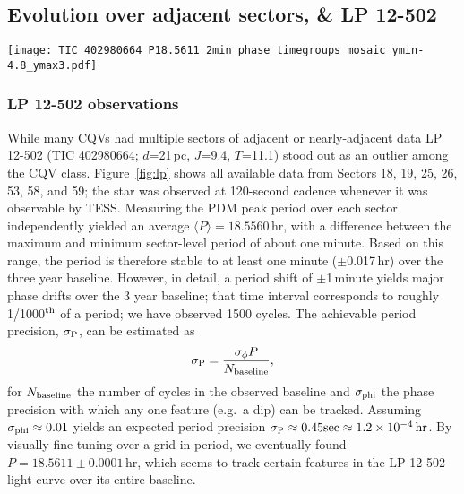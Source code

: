 \documentclass[11pt,twocolumn,tighten]{aastex63}
\begin{document}
\subsection{Evolution over adjacent sectors, \& LP 12-502}
\begin{figure*}[!t]
	\begin{center}
		\centering
		\texttt{[image: TIC\_402980664\_P18.5611\_2min\_phase\_timegroups\_mosaic\_ymin-4.8\_ymax3.pdf]}
		\vspace{-0.45cm}
		\caption{
			Evolution of LP 12-502 ($P$=18.6\,h) at fixed period and
			epoch over three years. 
			Each panel shows one (stacked) TESS orbit; small text denotes relative cycle number.
			There are 200 binned black points per cycle.
			The TESS pointing law dictates time gaps; larger gaps tend to
			yield larger shape changes.
			The dips usually evolve over tens to hundreds of cycles.
			However cycles 1233-1264 show a dip that ``switched'' from a depth
			and duration of 3\% and 3\,hr to 0.3\% and 1\,hr over less than
			one cycle.
		}
		\label{fig:lp}
	\end{center}


\end{figure*}

\subsubsection{LP 12-502 observations}
While many CQVs had multiple sectors of adjacent or nearly-adjacent data
LP 12-502 (TIC 402980664; $d$=21\,pc, $J$=9.4,
$T$=11.1) stood out as an outlier among the CQV class.
Figure~\ref{fig:lp} shows all available data from Sectors
18, 19, 25, 26, 53, 58, and 59; the star was observed at 120-second
cadence whenever it was observable by TESS.
Measuring the PDM peak period over each sector independently yielded
an average $\langle P \rangle = 18.5560$\,hr, with a difference
between the maximum and minimum sector-level period of about one minute.
Based on this range, the period is therefore stable to at least one
minute ($\pm$0.017\,hr) over the three year baseline.
However, in detail, a period shift of $\pm$1\,minute yields major
phase drifts over the 3 year baseline; that time interval
corresponds to roughly 1/1000$^{\rm th}$ of a period; we have
observed 1500 cycles.
The achievable period precision, $\sigma_{\rm P}$, can be estimated as
\begin{equation}
  \sigma_{\rm P} = \frac { \sigma_{\rm \phi} P } { N_{\rm baseline} },
\end{equation}
for $N_{\rm baseline}$ the number of cycles in the observed baseline and
$\sigma_{\rm phi}$ the phase precision with which any one feature (e.g.~a
dip) can be tracked.
Assuming $\sigma_{\rm phi} \approx 0.01$ yields an expected period precision
$\sigma_{\rm P} \approx 0.45 {\rm sec} \approx 1.2\times 10^{-4}\,{\rm hr}$.
By visually fine-tuning over a grid in period, we eventually 
found $P=18.5611 \pm 0.0001$\,hr, which seems to track certain
features in the LP 12-502 light curve over its entire baseline.
\end{document}
